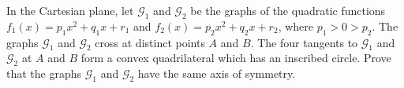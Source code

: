 In the Cartesian plane, let $\mathcal{G}_1$ and $\mathcal{G}_2$ be the graphs of the quadratic functions $f_1(x) = p_1x^2 + q_1x + r_1$ and $f_2(x) = p_2x^2 + q_2x + r_2$, where $p_1 > 0 > p_2$. The graphs $\mathcal{G}_1$ and $\mathcal{G}_2$ cross at distinct points $A$ and $B$. The four tangents to $\mathcal{G}_1$ and $\mathcal{G}_2$ at $A$ and $B$ form a convex quadrilateral which has an inscribed circle. Prove that the graphs $\mathcal{G}_1$ and $\mathcal{G}_2$ have the same axis of symmetry.